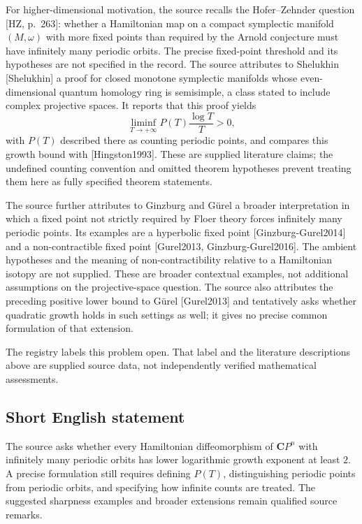\documentclass[11pt]{article}
\begin{document}
For higher-dimensional motivation, the source recalls the Hofer--Zehnder question [HZ, p.\ 263]: whether a Hamiltonian map on a compact symplectic manifold \((M,\omega)\) with more fixed points than required by the Arnold conjecture must have infinitely many periodic orbits. The precise fixed-point threshold and its hypotheses are not specified in the record. The source attributes to Shelukhin [Shelukhin] a proof for closed monotone symplectic manifolds whose even-dimensional quantum homology ring is semisimple, a class stated to include complex projective spaces. It reports that this proof yields
\[
\liminf_{T\to+\infty}P(T)\frac{\log T}{T}>0,
\]
with \(P(T)\) described there as counting periodic points, and compares this growth bound with [Hingston1993]. These are supplied literature claims; the undefined counting convention and omitted theorem hypotheses prevent treating them here as fully specified theorem statements.

The source further attributes to Ginzburg and G\"urel a broader interpretation in which a fixed point not strictly required by Floer theory forces infinitely many periodic points. Its examples are a hyperbolic fixed point [Ginzburg-Gurel2014] and a non-contractible fixed point [Gurel2013, Ginzburg-Gurel2016]. The ambient hypotheses and the meaning of non-contractibility relative to a Hamiltonian isotopy are not supplied. These are broader contextual examples, not additional assumptions on the projective-space question. The source also attributes the preceding positive lower bound to G\"urel [Gurel2013] and tentatively asks whether quadratic growth holds in such settings as well; it gives no precise common formulation of that extension.

The registry labels this problem open. That label and the literature descriptions above are supplied source data, not independently verified mathematical assessments.
\subsection{Short English statement}
The source asks whether every Hamiltonian diffeomorphism of \(\mathbf{C}P^n\) with infinitely many periodic orbits has lower logarithmic growth exponent at least \(2\). A precise formulation still requires defining \(P(T)\), distinguishing periodic points from periodic orbits, and specifying how infinite counts are treated. The suggested sharpness examples and broader extensions remain qualified source remarks.
\end{document}
